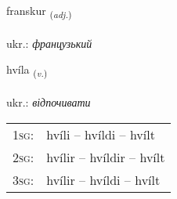 \documentclass[frontgrid, backgrid]{flacards}\usepackage[]{graphicx}\usepackage[]{xcolor}
\begin{document}
\renewcommand{\flhead}{\vskip5pt \fboxsep=0pt {\small\bfseries\footnotesize Lýsingarorð | прикметник}}
\renewcommand{\fcfoot}{\vskip5pt \fboxsep=0pt \hspace{2pt}{\small\bfseries\footnotesize 2K}}

\renewcommand{\blhead}{\vskip5pt {\small\bfseries\footnotesize Lýsingarorð | прикметник }}
\renewcommand{\bcfoot}{\vskip5pt \hspace{2pt}{\small\bfseries\footnotesize 2K}}


{franskur \small{\textsubscript{(\textit{adj.})}} \\[1ex] %
\textphonetic{[franskʏr]} \\
ukr.: \emph{французький} \\  [2ex]
\renewcommand*{\arraystretch}{0.8}
}

\renewcommand{\flhead}{\vskip5pt \fboxsep=0pt {\small\bfseries\footnotesize Sagnorð | дієслово}}
\renewcommand{\fcfoot}{\vskip5pt \fboxsep=0pt \hspace{2pt}{\small\bfseries\footnotesize 2K}}

\renewcommand{\blhead}{\vskip5pt {\small\bfseries\footnotesize Sagnorð | дієслово }}
\renewcommand{\bcfoot}{\vskip5pt \hspace{2pt}{\small\bfseries\footnotesize 2K}}


{hvíla \small{\textsubscript{(\textit{v.})}} \\[1ex] %
\textphonetic{[kʰviːla]} \\
ukr.: \emph{відпочивати} \\  [2ex]
\renewcommand*{\arraystretch}{0.8}
\begin{tabular}{p{1cm}l}
\textsc{1sg}: & hvíli -- hvíldi -- hvílt \\ 
\textsc{2sg}: & hvílir -- hvíldir -- hvílt \\ 
\textsc{3sg}: & hvílir -- hvíldi -- hvílt \\ 
\end{tabular}
}
\end{document}
